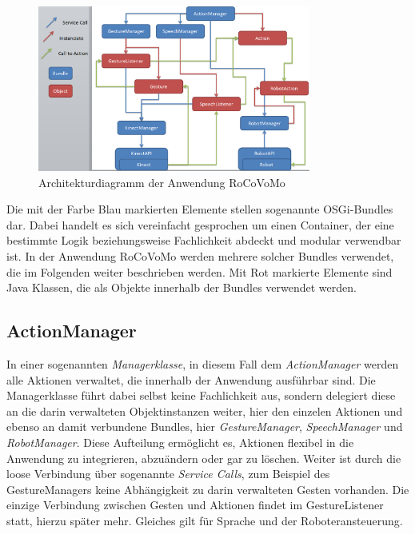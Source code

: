 \begin{figure}[htb]
\centering
\includegraphics[width=0.8\textwidth]{img/impl/architecture.png}
\caption[Architekturdiagramm der Anwendung RoCoVoMo]{Architekturdiagramm der Anwendung RoCoVoMo}
\label{fig:architecture}
\end{figure}

Die mit der Farbe Blau markierten Elemente stellen sogenannte \gls{OSGi}-Bundles dar. Dabei handelt es sich vereinfacht gesprochen um einen Container, der eine bestimmte Logik beziehungsweise Fachlichkeit abdeckt und modular verwendbar ist. In der Anwendung RoCoVoMo werden mehrere solcher Bundles verwendet, die im Folgenden weiter beschrieben werden. Mit Rot markierte Elemente sind Java Klassen, die als Objekte innerhalb der Bundles verwendet werden.

\subsection{ActionManager}
In einer sogenannten \textit{Managerklasse}, in diesem Fall dem \textit{ActionManager} werden alle Aktionen verwaltet, die innerhalb der Anwendung ausf\"uhrbar sind. Die Managerklasse f\"uhrt dabei selbst keine Fachlichkeit aus, sondern delegiert diese an die darin verwalteten Objektinstanzen weiter, hier den einzelen Aktionen und ebenso an damit verbundene Bundles, hier \textit{GestureManager}, \textit{SpeechManager} und \textit{RobotManager}.
\newline
Diese Aufteilung erm\"oglicht es, Aktionen flexibel in die Anwendung zu integrieren, abzu\"andern oder gar zu l\"oschen. Weiter ist durch die loose Verbindung \"uber sogenannte \textit{Service Calls}, zum Beispiel des GestureManagers keine Abh\"angigkeit zu darin verwalteten Gesten vorhanden. Die einzige Verbindung zwischen Gesten und Aktionen findet im GestureListener statt, hierzu sp\"ater mehr.
\newline
Gleiches gilt f\"ur Sprache und der Roboteransteuerung.

